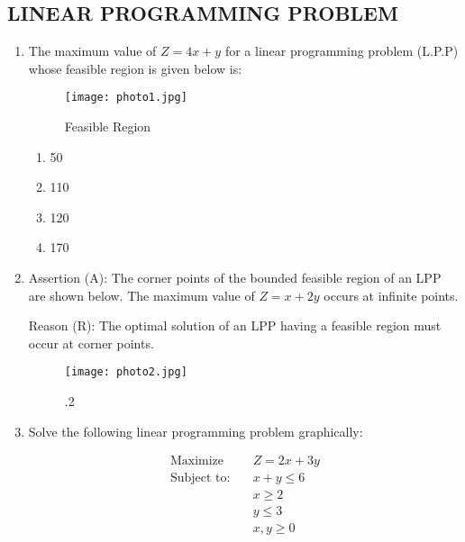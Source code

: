 \documentclass{article}
\begin{document}
\subsection*{LINEAR PROGRAMMING PROBLEM}

\begin{enumerate}[label=\arabic*.] %
    \item The maximum value of \( Z = 4x + y \) for a linear programming problem (L.P.P) whose feasible region is given below is:

    \begin{figure}[h]
        \centering
        \texttt{[image: photo1.jpg]}
        \caption{Feasible Region}
        \label{fig:feasible-region}
    \end{figure}

    \begin{enumerate}[label=\alph*)] %
        \item 50
        \item 110
        \item 120
        \item 170
    \end{enumerate}

    \item Assertion (A): The corner points of the bounded feasible region of an LPP are shown below. The maximum value of \( Z = x + 2y \) occurs at infinite points.

    Reason (R): The optimal solution of an LPP having a feasible region must occur at corner points.\\

\begin{figure}
    \centering
    \texttt{[image: photo2.jpg]}
    \caption{.2}
    \label{fig:enter-label}
\end{figure}

    \item Solve the following linear programming problem graphically:
    
    \begin{align*}
        \text{Maximize} \quad & Z = 2x + 3y \\
        \text{Subject to:} \quad & x + y \leq 6 \\
                                & x \geq 2 \\
                                & y \leq 3 \\
                                & x, y \geq 0
    \end{align*}
\end{enumerate}
\end{document}
